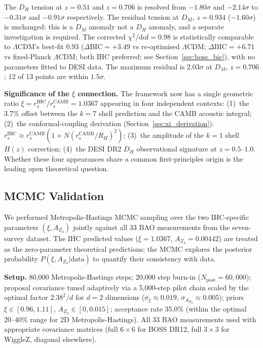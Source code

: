 \documentclass[12pt,a4paper]{article}
\begin{document}
The $D_H$ tension at $z = 0.51$ and $z = 0.706$ is resolved from $-1.80\sigma$
and $-2.14\sigma$ to $-0.31\sigma$ and $-0.91\sigma$ respectively. The residual
tension at $D_M$, $z = 0.934$ ($-1.60\sigma$) is unchanged: this is a $D_M$ anomaly
not a $D_H$ anomaly, and a separate investigation is required. The corrected
$\chi^2/\mathrm{dof} = 0.98$ is statistically comparable to $\Lambda$CDM's best-fit
$0.93$ ($\Delta\mathrm{BIC} = +3.49$ vs re-optimised $\Lambda$CDM; $\Delta\mathrm{BIC} = +6.71$ vs fixed-Planck $\Lambda$CDM; both IHC preferred; see Section~\ref{sec:boss_bic}),
with no parameters fitted to DESI data.
The maximum residual is $2.03\sigma$ at $D_M$, $z = 0.706$; 12 of 13 points are
within $1.5\sigma$.

\textbf{Significance of the $\xi$ connection.} The framework now has a single
geometric ratio $\xi = r_s^\mathrm{IHC}/r_s^\mathrm{CAMB} = 1.0367$ appearing in
four independent contexts: (1)~the 3.7\% offset between the $k=7$ shell prediction
and the CAMB acoustic integral; (2)~the conformal-coupling derivation
(Section~\ref{sec:xi_derivation}): $r_s^\mathrm{IHC} \approx r_s^\mathrm{CAMB}(1+N(r_s^\mathrm{CAMB}/R_H)^2)$;
(3)~the amplitude of the $k=1$ shell $H(z)$ correction; (4)~the DESI DR2
$D_H$ observational signature at $z = 0.5$--$1.0$. Whether these four appearances
share a common first-principles origin is the leading open theoretical question.

\subsection{MCMC Validation}
\label{sec:mcmc}

We performed Metropolis-Hastings MCMC sampling over the two IHC-specific parameters
$(\xi, A_{Z_3})$ jointly against all 33 BAO measurements from the seven-survey
dataset. The IHC predicted values ($\xi = 1.0367$, $A_{Z_3} = 0.00442$) are treated
as the zero-parameter theoretical predictions; the MCMC explores the posterior
probability $P(\xi, A_{Z_3} | \mathrm{data})$ to quantify their consistency with data.

\textbf{Setup.} 80,000 Metropolis-Hastings steps; 20,000 step burn-in
($N_\mathrm{post} = 60{,}000$); proposal covariance tuned adaptively via a 5,000-step
pilot chain scaled by the optimal factor $2.38^2/d$ for $d=2$ dimensions
($\sigma_\xi \approx 0.019$, $\sigma_{A_{Z_3}} \approx 0.005$);
priors $\xi \in [0.96, 1.11]$, $A_{Z_3} \in [0, 0.015]$;
acceptance rate 35.0\% (within the optimal 20--40\% range for 2D Metropolis-Hastings).
All 33 BAO measurements used with appropriate covariance matrices
(full $6{\times}6$ for BOSS DR12, full $3{\times}3$ for WiggleZ, diagonal elsewhere).
\end{document}
